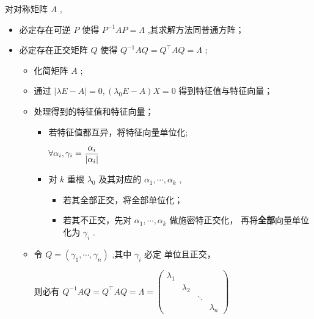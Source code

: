 对对称矩阵 $ A $ ,
\begin{itemize}
    \item 必定存在可逆 $ P $ 使得 $ P^{-1}AP = \Lambda $ ,其求解方法同普通方阵；
    \item 必定存在正交矩阵 $ Q $ 使得 $ Q^{-1}AQ = Q^\top AQ = \Lambda $ ;
    \begin{itemize}
        \item 化简矩阵 $ A $ ;
        \item 通过 $ |\lambda E - A| = 0, (\lambda_0E-A)X = 0 $ 得到特征值与特征向量；
        \item 处理得到的特征值和特征向量；
        \begin{itemize}
            \item 若特征值都互异，将特征向量单位化;
            
            $\displaystyle \forall \alpha_i,\gamma_i = \dfrac{\alpha_i}{|\alpha_i|}$ 
            \item 对 $ k $ 重根 $ \lambda_0 $ 及其对应的 $ \alpha_1,\cdots,\alpha_k $ ,
            \begin{itemize}
                \item 若其全部正交，将全部单位化；
                \item 若其不正交，先对 $ \alpha_1,\cdots,\alpha_k $ 做施密特正交化，
                再将\textbf{全部}向量单位化为 $ \gamma_i $ .
            \end{itemize}
        \end{itemize}
        \item 令 $ Q = (\gamma_1,\cdots,\gamma_n) $ ,其中 $ \gamma_i $ 必定
        单位且正交，
        
        则必有 $ Q^{-1}AQ = Q^\top AQ = \Lambda = \begin{pmatrix}
            \lambda_1&&&\\&\lambda_2&&\\&&\ddots&\\&&&\lambda_n
        \end{pmatrix} $ 
    \end{itemize}
\end{itemize}

